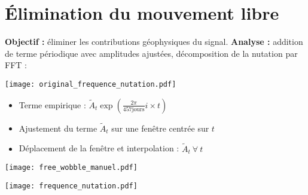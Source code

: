 \section{Élimination du mouvement libre}
\begin{frame}
  	\textbf{Objectif :} éliminer les contributions géophysiques du signal.
  	\vfil
	\textbf{Analyse :} addition de terme périodique avec amplitudes ajustées, décomposition de la nutation par FFT :

  	\centerline{\texttt{[image: original\_frequence\_nutation.pdf]}}
\end{frame}

\begin{frame}
  \begin{itemize}
    \item Terme empirique : $ \tilde{A}_t \exp\left( \frac{2\pi }{457 \mbox{jours}}i \times t  \right) $
    \item Ajustement du terme $ \tilde{A}_t $ sur une fenêtre centrée sur $t$ 
    \item Déplacement de la fenêtre et interpolation : $ \tilde{A}_t\ \forall\ t $
  \end{itemize}

  \centerline{\texttt{[image: free\_wobble\_manuel.pdf]}}
\end{frame}


\begin{frame}
  \texttt{[image: frequence\_nutation.pdf]}
\end{frame}

